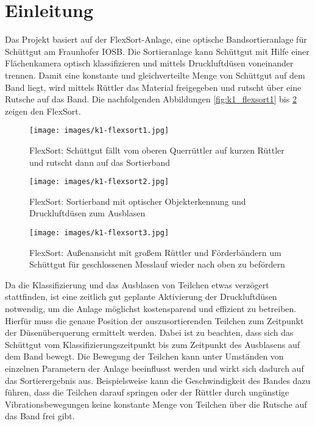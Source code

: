 \section{Einleitung}

Das Projekt basiert auf der FlexSort-Anlage, eine optische Bandsortieranlage für Schüttgut am Fraunhofer IOSB. Die Sortieranlage kann Schüttgut mit Hilfe einer Flächenkamera optisch klassifizieren und mittels Druckluftdüsen voneinander trennen. Damit eine konstante und gleichverteilte Menge von Schüttgut auf dem Band liegt, wird mittels Rüttler das Material freigegeben und rutscht über eine Rutsche auf das Band. Die nachfolgenden Abbildungen \ref{fig:k1_flexsort1} bis \ref{fig:k1_flexsort3} zeigen den FlexSort.

\begin{figure}[htb]
	\centering
	\begin{minipage}[t]{0.4\linewidth}
		\centering
		\texttt{[image: images/k1-flexsort1.jpg]}
		\caption{FlexSort: Schüttgut fällt vom oberen Querrüttler auf kurzen Rüttler und rutscht dann auf das Sortierband}
		\label{fig:k1_flexsort1}
	\end{minipage}%
	\hfill
	\begin{minipage}[t]{0.54\linewidth}
		\centering
		\texttt{[image: images/k1-flexsort2.jpg]}
		\caption{FlexSort: Sortierband mit optischer Objekterkennung und Druckluftdüsen zum Ausblasen}
		\label{fig:k1_flexsort2}
	\end{minipage}
\end{figure}

\begin{figure}[htb]
	\centering
	\texttt{[image: images/k1-flexsort3.jpg]}
	\caption{FlexSort: Außenansicht mit großem Rüttler und Förderbändern um Schüttgut für geschlossenen Messlauf wieder nach oben zu befördern}
	\label{fig:k1_flexsort3}
\end{figure}

Da die Klassifizierung und das Ausblasen von Teilchen etwas verzögert stattfinden, ist eine zeitlich gut geplante Aktivierung der Druckluftdüsen notwendig, um die Anlage möglichst kostensparend und effizient zu betreiben. Hierfür muss die genaue Position der auszusortierenden Teilchen zum Zeitpunkt der Düsenüberquerung ermittelt werden. Dabei ist zu beachten, dass sich das Schüttgut vom Klassifizierungszeitpunkt bis zum Zeitpunkt des Ausblasens auf dem Band bewegt. Die Bewegung der Teilchen kann unter Umständen von einzelnen Parametern der Anlage beeinflusst werden und wirkt sich dadurch auf das Sortierergebnis aus. Beispielsweise kann die Geschwindigkeit des Bandes dazu führen, dass die Teilchen darauf springen oder der Rüttler durch ungünstige Vibrationsbewegungen keine konstante Menge von Teilchen über die Rutsche auf das Band frei gibt. 

